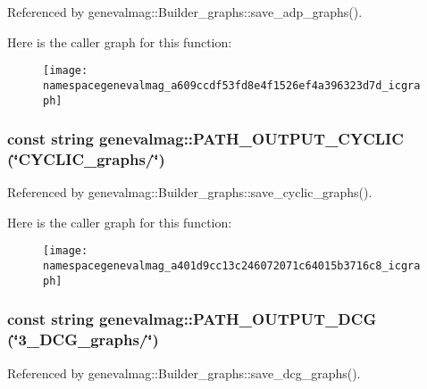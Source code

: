 Referenced by genevalmag::Builder\_\-graphs::save\_\-adp\_\-graphs().



Here is the caller graph for this function:\nopagebreak
\begin{figure}[H]
\begin{center}
\leavevmode
\texttt{[image: namespacegenevalmag\_a609ccdf53fd8e4f1526ef4a396323d7d\_icgraph]}
\end{center}
\end{figure}


\hypertarget{namespacegenevalmag_a401d9cc13c246072071c64015b3716c8}{
\subsubsection[{PATH\_\-OUTPUT\_\-CYCLIC}]{\setlength{\rightskip}{0pt plus 5cm}const string genevalmag::PATH\_\-OUTPUT\_\-CYCLIC (\char`\"{}CYCLIC\_\-graphs/\char`\"{})}}
\label{namespacegenevalmag_a401d9cc13c246072071c64015b3716c8}


Referenced by genevalmag::Builder\_\-graphs::save\_\-cyclic\_\-graphs().



Here is the caller graph for this function:\nopagebreak
\begin{figure}[H]
\begin{center}
\leavevmode
\texttt{[image: namespacegenevalmag\_a401d9cc13c246072071c64015b3716c8\_icgraph]}
\end{center}
\end{figure}


\hypertarget{namespacegenevalmag_a85c614ca01eca9ab0edd6bdf400259fd}{
\subsubsection[{PATH\_\-OUTPUT\_\-DCG}]{\setlength{\rightskip}{0pt plus 5cm}const string genevalmag::PATH\_\-OUTPUT\_\-DCG (\char`\"{}3\_\-DCG\_\-graphs/\char`\"{})}}
\label{namespacegenevalmag_a85c614ca01eca9ab0edd6bdf400259fd}


Referenced by genevalmag::Builder\_\-graphs::save\_\-dcg\_\-graphs().



